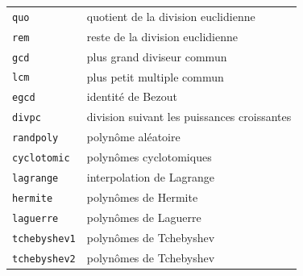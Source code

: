 \documentclass{article}
\begin{document}
\begin{giacjshere}
\begin{center}
\begin{tabular}{|ll|}
\hline
\verb|quo| & quotient de la division euclidienne\\
\verb|rem| & reste de la division euclidienne\\
\verb|gcd| & plus grand diviseur commun\\
\verb|lcm| & plus petit multiple commun\\
\verb|egcd| & identit\'e de Bezout\\
\verb|divpc| & division suivant les puissances croissantes\\
\hline
\verb|randpoly| & polyn\^ome al\'eatoire\\
\verb|cyclotomic| & polyn\^omes cyclotomiques\\
\verb|lagrange| & interpolation de Lagrange\\
\verb|hermite| & polyn\^omes de Hermite\\
\verb|laguerre| & polyn\^omes de Laguerre\\
\verb|tchebyshev1| & polyn\^omes de Tchebyshev\\
\verb|tchebyshev2| & polyn\^omes de Tchebyshev\\
\hline
\end{tabular}
\end{center}
%

\end{giacjshere}
\end{document}

